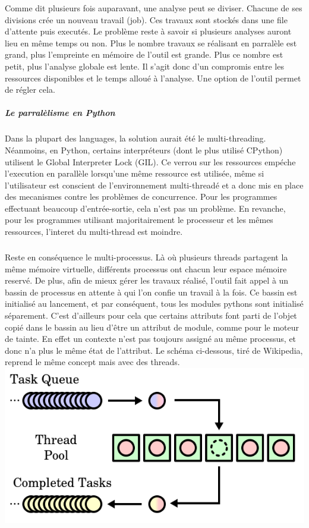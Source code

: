 Comme dit plusieurs fois auparavant, une analyse peut se diviser. Chacune de ses divisions crée un nouveau travail (job). Ces travaux sont stockés dans une file d'attente
puis executés. Le problème reste à savoir si plusieurs analyses auront lieu en même temps ou non. Plus le nombre travaux se réalisant en parralèle est grand, plus l'empreinte en mémoire de l'outil
est grande. Plus ce nombre est petit, plus l'analyse globale est lente. Il s'agit donc d'un compromis entre les ressources disponibles et le temps alloué à l'analyse. Une option de l'outil permet
de régler cela.
\subparagraph{Le parralèlisme en Python}
Dans la plupart des languages, la solution aurait été le multi-threading. Néanmoins, en Python, certains interpréteurs (dont le plus utilisé CPython) utilisent le Global Interpreter Lock (GIL).
Ce verrou sur les ressources empéche l'execution en parallèle lorsqu'une même ressource est utilisée, même si l'utilisateur est conscient de l'environnement multi-threadé et a donc mis en place
des mecanismes contre les problèmes de concurrence. Pour les programmes effectuant beaucoup d'entrée-sortie, cela n'est pas un problème. En revanche, pour les programmes utilisant majoritairement
le processeur et les mêmes ressources, l'interet du multi-thread est moindre.
\subparagraph{}
Reste en conséquence le multi-processus. Là où plusieurs threads partagent la même mémoire virtuelle, différents processus ont chacun leur espace mémoire reservé. De plus,
afin de mieux gérer les travaux réalisé, l'outil fait appel à un bassin de processus en attente à qui l'on confie un travail à la fois. Ce bassin est initialisé au lancement,
et par conséquent, tous les modules pythons sont initialisé séparement. C'est d'ailleurs pour cela que certains attributs font parti de l'objet copié dans le bassin au lieu d'être
un attribut de module, comme pour le moteur de tainte. En effet un contexte n'est pas toujours assigné au même processus, et donc n'a plus le même état de l'attribut.
Le schéma ci-dessous, tiré de Wikipedia, reprend le même concept mais avec des threads.
\includegraphics[scale=0.5]{threadpool.png}\newline
